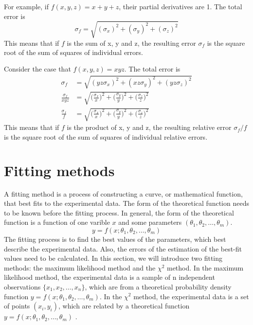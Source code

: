 \documentclass[12pt,a4paper]{report}
\begin{document}
For example, if $f(x,y,z) = x+y+z$, their partial derivatives are 1. The total error is
\begin{equation*}
\sigma_{f} = \sqrt{( \sigma_x )^2 + ( \sigma_y )^2+ ( \sigma_z )^2}
\end{equation*}
 This means that if $f$ is the sum of x, y and z, the resulting error $\sigma_{f}$ is the square root of the sum of squares of individual errors.
 
Consider the case that $f(x,y,z) = xyz$. The total error is
\begin{align*}
\sigma_{f} &= \sqrt{( yz \sigma_x )^2 + ( xz \sigma_y )^2+ ( yz \sigma_z )^2} \\
\frac{ \sigma_{f} }{xyz} &= \sqrt{ \Big( \frac{\sigma_x}{x} \Big)^2 + \Big( \frac{\sigma_y}{y} \Big)^2 + \Big( \frac{\sigma_z}{z} \Big)^2} \\
\frac{ \sigma_{f} }{f} &= \sqrt{ \Big( \frac{\sigma_x}{x} \Big)^2 + \Big( \frac{\sigma_y}{y} \Big)^2 + \Big( \frac{\sigma_z}{z} \Big)^2}
\end{align*}
This means that if $f$ is the product of x, y and z, the resulting relative error $\sigma_{f}/f$ is the square root of the sum of squares of individual relative errors.

\section{Fitting methods}
A fitting method is a process of constructing a curve, or mathematical function, that best fits to the experimental data.
The form of the theoretical function needs to be known before the fitting process.
In general, the form of the theoretical function is a function of one varible $x$ and some parameters $(\theta_1,\theta_2,\dots,\theta_m)$.
\begin{equation*}
y = f(x;\theta_1,\theta_2,\dots,\theta_m)
\end{equation*}
The fitting process is to find the best values of the parameters, which best describe the experimental data.
Also, the errors of the estimation of the best-fit values need to be calculated.
In this section, we will introduce two fitting methods: the maximum likelihood method and the $\chi^2$ method.
In the maximum likelihood method, the experimental data is a sample of n independent observations $\{ x_1, x_2, \dots , x_n \}$, which are from a theoretical probability density function $y = f(x;\theta_1,\theta_2,\dots,\theta_m)$.
In the $\chi^2$ method, the experimental data is a set of points $(x_i,y_i)$, which are related by a theoretical function $y = f(x;\theta_1,\theta_2,\dots,\theta_m)$ .
\end{document}
